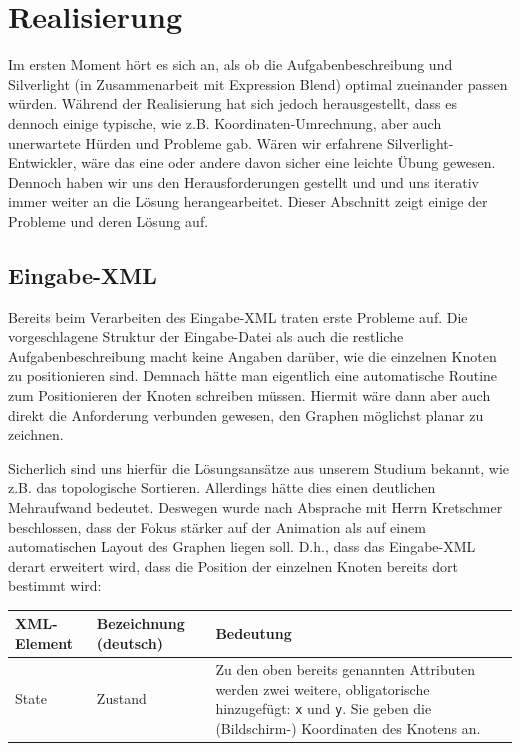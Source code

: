 \section{Realisierung}
Im ersten Moment hört es sich an, als ob die Aufgabenbeschreibung und
Silverlight (in Zusammenarbeit mit Expression Blend) optimal zueinander passen
würden. Während der Realisierung hat sich jedoch herausgestellt, dass es
dennoch einige typische, wie z.B. Koordinaten-Umrechnung, aber auch unerwartete
Hürden und Probleme gab. Wären wir erfahrene Silverlight-Entwickler, wäre das
eine oder andere davon sicher eine leichte Übung gewesen. Dennoch haben wir uns
den Herausforderungen gestellt und und uns iterativ immer weiter an die Lösung
herangearbeitet. Dieser Abschnitt zeigt einige der Probleme und deren Lösung
auf.

\subsection{Eingabe-XML}
Bereits beim Verarbeiten des Eingabe-XML traten erste Probleme auf. Die
vorgeschlagene Struktur der Eingabe-Datei als auch die restliche
Aufgabenbeschreibung macht keine Angaben darüber, wie die einzelnen Knoten zu
positionieren sind. Demnach hätte man eigentlich eine automatische Routine zum
Positionieren der Knoten schreiben müssen. Hiermit wäre dann aber auch direkt
die Anforderung verbunden gewesen, den Graphen möglichst planar zu zeichnen.

Sicherlich sind uns hierfür die Lösungsansätze aus unserem Studium bekannt, wie
z.B. das topologische Sortieren. Allerdings hätte dies einen deutlichen
Mehraufwand bedeutet. Deswegen wurde nach Absprache mit Herrn Kretschmer
beschlossen, dass der Fokus stärker auf der Animation als auf einem
automatischen Layout des Graphen liegen soll. D.h., dass das Eingabe-XML derart
erweitert wird, dass die Position der einzelnen Knoten bereits dort bestimmt
wird:

\begin{table}[H]
	\centering
	\begin{tabular}{|l|l|l|}\hline
XML-Element & Bezeichnung (deutsch) & Bedeutung \\ \hline
State       & Zustand               & 
\begin{minipage}{0.5\textwidth}
		Zu den oben bereits genannten Attributen werden zwei weitere, obligatorische
		hinzugefügt: \texttt{x} und \texttt{y}. Sie geben die (Bildschirm-) Koordinaten des Knotens
		an.\vspace{1ex}
	\end{minipage}\\ \hline
\end{tabular}
\end{table}

